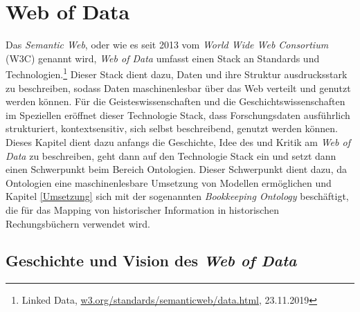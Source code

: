 \documentclass[12pt,a4paper]{article}
\begin{document}
\newpage
\section{Web of Data}
\label{WebofData}
Das \textit{Semantic Web}, oder wie es seit 2013 vom \textit{World Wide Web Consortium} (W3C) genannt wird, \textit{Web of Data} umfasst einen Stack an Standards und Technologien.\footnote{Linked Data, \url{w3.org/standards/semanticweb/data.html}, 23.11.2019} Dieser Stack dient dazu, Daten und ihre Struktur ausdrucksstark zu beschreiben, sodass Daten maschinenlesbar über das Web verteilt und genutzt werden können. Für die Geisteswissenschaften und die Geschichtswissenschaften im Speziellen eröffnet dieser Technologie Stack, dass Forschungsdaten ausführlich strukturiert, kontextsensitiv, sich selbst beschreibend, genutzt werden können.
\\
Dieses Kapitel dient dazu anfangs die Geschichte, Idee des und Kritik am \textit{Web of Data} zu beschreiben, geht dann auf den Technologie Stack ein und setzt dann einen Schwerpunkt beim Bereich Ontologien. Dieser Schwerpunkt dient dazu, da Ontologien eine maschinenlesbare Umsetzung von Modellen ermöglichen und Kapitel \ref{Umsetzung} sich mit der sogenannten \textit{Bookkeeping Ontology} beschäftigt, die für das Mapping von historischer Information in historischen Rechungsbüchern verwendet wird.  

\subsection{Geschichte und Vision des \textit{Web of Data}}
\end{document}
